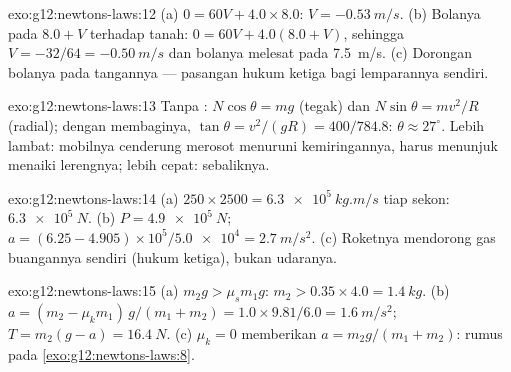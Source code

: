 \begin{solution}{exo:g12:newtons-laws:12}
(a) $0 = 60V + 4.0 \times 8.0$: $V = \qty{-0.53}{m/s}$.
(b) Bolanya pada $8.0 + V$ terhadap tanah: $0 = 60V + 4.0(8.0 + V)$, sehingga
$V = -32/64 = \qty{-0.50}{m/s}$ dan bolanya melesat pada \qty{7.5}{m/s}.
(c) Dorongan bolanya pada tangannya --- pasangan hukum ketiga bagi lemparannya
sendiri.
\end{solution}

\begin{solution}{exo:g12:newtons-laws:13}
Tanpa : $N\cos\theta = mg$ (tegak) dan $N\sin\theta =
mv^2/R$ (radial); dengan membaginya, $\tan\theta = v^2/(gR) = 400/784.8$:
$\theta \approx 27^\circ$. Lebih lambat: mobilnya cenderung merosot menuruni
kemiringannya,  harus menunjuk menaiki lerengnya; lebih cepat: sebaliknya.
\end{solution}

\begin{solution}{exo:g12:newtons-laws:14}
(a) $250 \times 2500 = \qty{6.3e5}{kg.m/s}$ tiap sekon: 
$\qty{6.3e5}{N}$. (b) $P = \qty{4.9e5}{N}$;
$a = (6.25 - 4.905) \times 10^5 / \num{5.0e4} = \qty{2.7}{m/s^2}$.
(c) Roketnya mendorong gas buangannya sendiri (hukum ketiga), bukan udaranya.
\end{solution}

\begin{solution}{exo:g12:newtons-laws:15}
(a) $m_2 g > \mu_s m_1 g$: $m_2 > 0.35 \times 4.0 = \qty{1.4}{kg}$.
(b) $a = (m_2 - \mu_k m_1)\,g/(m_1 + m_2) = 1.0 \times 9.81/6.0 =
\qty{1.6}{m/s^2}$; $T = m_2(g - a) = \qty{16.4}{N}$.
(c) $\mu_k = 0$ memberikan $a = m_2 g/(m_1 + m_2)$: rumus pada
\cref{exo:g12:newtons-laws:8}.
\end{solution}

